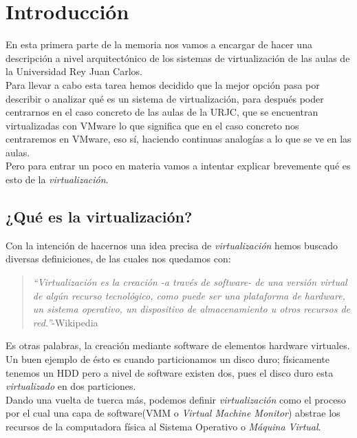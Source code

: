 \chapter{Introducción}
\lettrine[lines=1,slope=4pt,findent=0pt]{E}{}n esta primera parte de la memoria nos vamos a encargar de hacer una descripción a nivel arquitectónico de los sistemas de virtualización de las aulas de la Universidad Rey Juan Carlos.\\

\noindent Para llevar a cabo esta tarea hemos decidido que la mejor opción pasa por describir o analizar qué es un sistema de virtualización, para después poder centrarnos en el caso concreto de las aulas de la URJC, que se encuentran virtualizadas con VMware\cite{vmware} lo que significa que en el caso concreto nos centraremos en VMware, eso sí, haciendo continuas analogías a lo que se ve en las aulas.\\

\noindent Pero para entrar un poco en materia vamos a intentar explicar brevemente qué es esto de la \emph{virtualización}.

\section{¿Qué es la virtualización?}
\noindent Con la intención de hacernos una idea precisa de \emph{virtualización} hemos buscado diversas definiciones, de las cuales nos quedamos con:
\begin{quote}
\emph{\textquotedblleft Virtualización es la creación -a través de software- de una versión virtual de algún recurso tecnológico, como puede ser una plataforma de hardware, un sistema operativo, un dispositivo de almacenamiento u otros recursos de red.\textquotedblright}-Wikipedia\cite{defvirwiki}\\
\end{quote}

\noindent Es otras palabras, la creación mediante software de elementos hardware virtuales. Un buen ejemplo de ésto es cuando particionamos un disco duro; físicamente tenemos un HDD pero a nivel de software existen dos, pues el disco duro esta \emph{virtualizado} en dos particiones.\\

\noindent Dando una vuelta de tuerca más, podemos definir \emph{virtualización} como el proceso por el cual una capa de software(VMM o \emph{Virtual Machine Monitor}) abstrae los recursos de la computadora física al Sistema Operativo o \emph{Máquina Virtual}.

